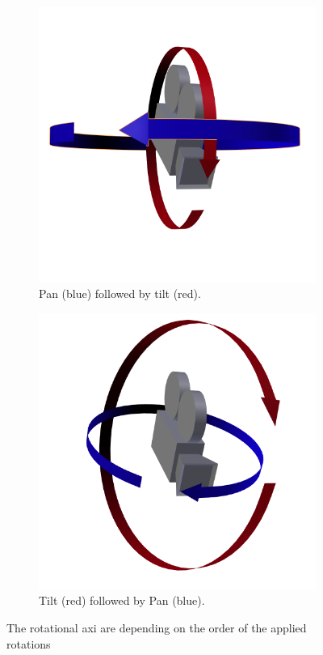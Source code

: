 \begin{figure}[H]
	\centering
	\begin{subfigure}[t]{0.45\columnwidth}
		\centering
		\includegraphics[width=0.8\columnwidth]{../results/images/PanTilt.png}
		\caption{Pan (blue) followed by tilt (red).}
	\end{subfigure}
	\begin{subfigure}[t]{0.45\columnwidth}
		\centering
		\includegraphics[width=0.8\columnwidth]{../results/images/TiltPan.png}
		\caption{Tilt (red) followed by Pan (blue).}
	\end{subfigure}
	\caption{The rotational axi are depending on the order of the applied rotations}
	\label{fig:PTorTP}
\end{figure}

